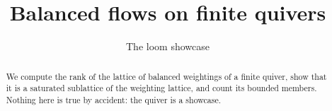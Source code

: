 \documentclass[11pt]{amsart}
\title{Balanced flows on finite quivers}
\author{The loom showcase}
\theoremstyle{plain}
\theoremstyle{definition}
\theoremstyle{remark}
\begin{document}
\maketitle

\begin{abstract}
We compute the rank of the lattice of balanced weightings of a finite quiver, show that it is a saturated sublattice of the weighting lattice, and count its bounded members. Nothing here is true by accident: the quiver is a showcase.
\end{abstract}




\end{document}
